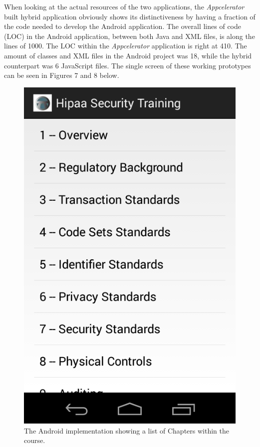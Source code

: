 \documentclass[11pt, twocolumn]{article}
\begin{document}
When looking at the actual resources of the two applications, the {\it Appcelerator} built hybrid application obviously shows its distinctiveness by having a fraction of the code needed to develop the Android application.  The overall lines of code (LOC) in the Android application, between both Java and XML files, is along the lines of 1000.  The LOC within the {\it Appcelerator} application is right at 410.  The amount of classes and XML files in the Android project was 18, while the hybrid counterpart was 6 JavaScript files.  The single screen of these working prototypes  can be seen in Figures 7 and 8 below.

\begin{figure}[h!]
\includegraphics[scale=0.35]{android-chapter-implementation}
\caption{The Android implementation showing a list of Chapters within the course.}
\end{figure}
\end{document}
